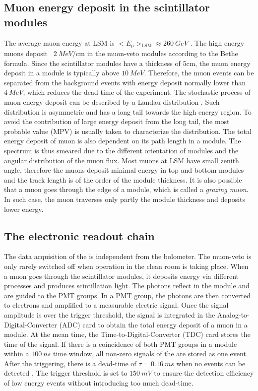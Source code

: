 \subsection{Muon energy deposit in the scintillator modules}
The average muon energy at LSM is $<E_{\upmu}>_{\mathrm{LSM}}\approx \SI{260}{GeV}$ \cite{Klu13}. The high energy muons deposit ~$\SI{2}{MeV\per\cm}$ in the muon-veto modules according to the Bethe formula. Since the scintillator modules have a thickness of 5cm, the muon energy deposit in a module is typically above $\SI{10}{MeV}$. Therefore, the muon events can be separated from the background events with energy deposit normally lower than $\SI{4}{MeV}$, which reduces the dead-time of the experiment.
The stochastic process of muon energy deposit can be described by a Landau distribution \cite{Lan44}. Such distribution is asymmetric and has a long tail towards the high energy region. To avoid the contribution of large energy deposit from the long tail, the most probable value (MPV) is usually taken to characterize the distribution.
The total energy deposit of muon is also dependent on its path length in a module. The spectrum is thus smeared due to the different orientation of modules and the angular distribution of the muon flux. Most muons at LSM have small zenith angle, therefore the muons deposit minimal energy in top and bottom modules and the track length is of the order of the module thickness.
It is also possible that a muon goes through the edge of a module, which is called a \textit{grazing muon}. In such case, the muon traverses only partly the module thickness and deposits lower energy.

\subsection{The electronic readout chain}
The data acquisition of the \mvs{} is independent from the bolometer. The muon-veto is only rarely switched off when operation in the clean room is taking place.
When a muon goes through the scintillator modules, it deposits energy via different processes and produces scintillation light. The photons reflect in the module and are guided to the PMT groups. In a PMT group, the photons are then converted to electrons and amplified to a measurable electric signal. Once the signal amplitude is over the trigger threshold, the signal is integrated in the Analog-to-Digital-Converter (ADC) card to obtain the total energy deposit of a muon in a module. At the mean time, the Time-to-Digital-Converter (TDC) card stores the time of the signal. If there is a coincidence of both PMT groups in a module within a $\SI{100}{ns}$ time window, all non-zero signals of the \mvs{} are stored as one event. After the triggering, there is a dead-time of $\tau=\SI{0.16}{ms}$ when no events can be detected \cite{Sch13b}. The trigger threshold is set to $\SI{150}{mV}$ to ensure the detection efficiency of low energy events without introducing too much dead-time.

